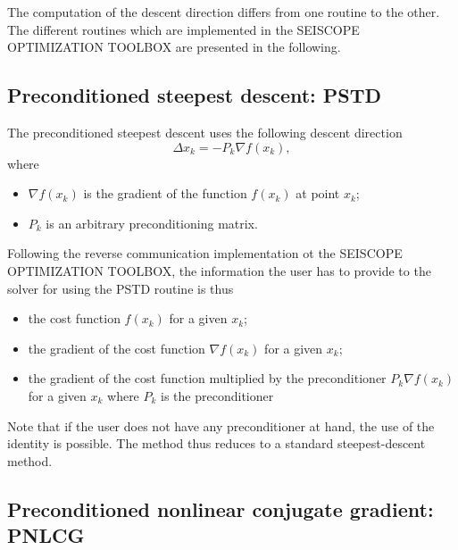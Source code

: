 \documentclass[a4paper,twoside,final,onecolumn,11pt,openright]{article}
\begin{document}
The computation of the descent direction differs from one routine to the other. The different routines which are implemented in the SEISCOPE OPTIMIZATION TOOLBOX are presented in the following.
\subsection{Preconditioned steepest descent: PSTD}

The preconditioned steepest descent uses the following descent direction
\begin{equation}
 \Delta x_k=-P_k\nabla f(x_k),
\end{equation}
where 
\begin{itemize}
 \item $\nabla f(x_k)$ is the gradient of the function $f(x_k)$ at point $x_k$;
 \item $P_k$ is an arbitrary preconditioning matrix. 
\end{itemize}
Following the reverse communication implementation ot the SEISCOPE OPTIMIZATION TOOLBOX, the information the user has to provide to the solver for using the PSTD routine is thus
\begin{itemize}
 \item the cost function $f(x_k)$ for  a given $x_k$;
 \item the gradient of the cost function $\nabla f(x_k)$ for  a given $x_k$;
 \item the gradient of the cost function multiplied by the preconditioner $P_k\nabla f(x_k)$ for a given $x_k$ where $P_k$ is the preconditioner
\end{itemize}
Note that if the user does not have any preconditioner at hand, the use of the identity is possible. The method thus reduces to a standard steepest-descent method. 

\subsection{Preconditioned nonlinear conjugate gradient: PNLCG}
\end{document}
